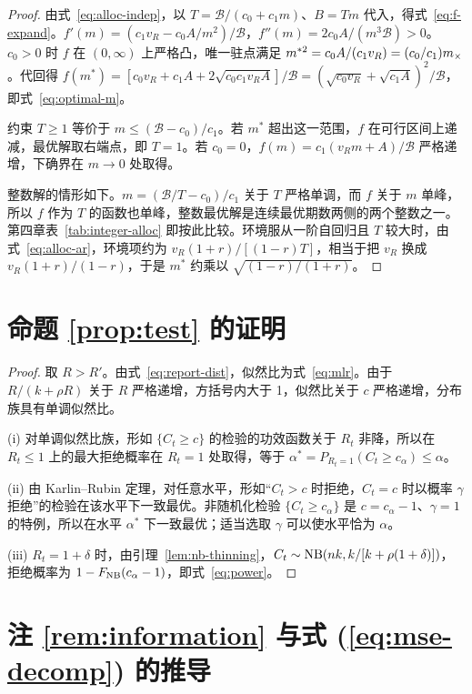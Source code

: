 \begin{proof}
由式~\eqref{eq:alloc-indep}，以 $T=\mathcal B/(c_0+c_1m)$、$B=Tm$ 代入，得式~\eqref{eq:f-expand}。$f'(m)=(c_1v_R-c_0A/m^2)/\mathcal B$，$f''(m)=2c_0A/(m^3\mathcal B)>0$。$c_0>0$ 时 $f$ 在 $(0,\infty)$ 上严格凸，唯一驻点满足 $m^{*2}=c_0A/(c_1v_R)=(c_0/c_1)m_{\times}$。代回得 $f(m^*)=[c_0v_R+c_1A+2\sqrt{c_0c_1v_RA}]/\mathcal B=(\sqrt{c_0v_R}+\sqrt{c_1A})^2/\mathcal B$，即式~\eqref{eq:optimal-m}。

约束 $T\geq1$ 等价于 $m\leq(\mathcal B-c_0)/c_1$。若 $m^*$ 超出这一范围，$f$ 在可行区间上递减，最优解取右端点，即 $T=1$。若 $c_0=0$，$f(m)=c_1(v_Rm+A)/\mathcal B$ 严格递增，下确界在 $m\to0$ 处取得。

整数解的情形如下。$m=(\mathcal B/T-c_0)/c_1$ 关于 $T$ 严格单调，而 $f$ 关于 $m$ 单峰，所以 $f$ 作为 $T$ 的函数也单峰，整数最优解是连续最优期数两侧的两个整数之一。第四章表~\ref{tab:integer-alloc} 即按此比较。环境服从一阶自回归且 $T$ 较大时，由式~\eqref{eq:alloc-ar}，环境项约为 $v_R(1+r)/[(1-r)T]$，相当于把 $v_R$ 换成 $v_R(1+r)/(1-r)$，于是 $m^*$ 约乘以 $\sqrt{(1-r)/(1+r)}$。
\end{proof}

\section{\texorpdfstring{命题 \ref{prop:test} 的证明}{命题 4.2 的证明}}
\label{app:test}

\begin{proof}
取 $R>R'$。由式~\eqref{eq:report-dist}，似然比为式~\eqref{eq:mlr}。由于 $R/(k+\rho R)$ 关于 $R$ 严格递增，方括号内大于 1，似然比关于 $c$ 严格递增，分布族具有单调似然比。

(i) 对单调似然比族，形如 $\{C_t\geq c\}$ 的检验的功效函数关于 $R_t$ 非降\citep{lehmann2005testing}，所以在 $R_t\leq1$ 上的最大拒绝概率在 $R_t=1$ 处取得，等于 $\alpha^*=P_{R_t=1}(C_t\geq c_\alpha)\leq\alpha$。

(ii) 由 Karlin--Rubin 定理\citep{karlin1956theory}，对任意水平，形如“$C_t>c$ 时拒绝，$C_t=c$ 时以概率 $\gamma$ 拒绝”的检验在该水平下一致最优。非随机化检验 $\{C_t\geq c_\alpha\}$ 是 $c=c_\alpha-1$、$\gamma=1$ 的特例，所以在水平 $\alpha^*$ 下一致最优；适当选取 $\gamma$ 可以使水平恰为 $\alpha$。

(iii) $R_t=1+\delta$ 时，由引理~\ref{lem:nb-thinning}，$C_t\sim\operatorname{NB}(nk,k/[k+\rho(1+\delta)])$，拒绝概率为 $1-F_{\operatorname{NB}}(c_\alpha-1)$，即式~\eqref{eq:power}。
\end{proof}

\section{\texorpdfstring{注 \ref{rem:information} 与式 (\ref{eq:mse-decomp}) 的推导}{注 4.1 与均方误差分解的推导}}
\label{app:information}

